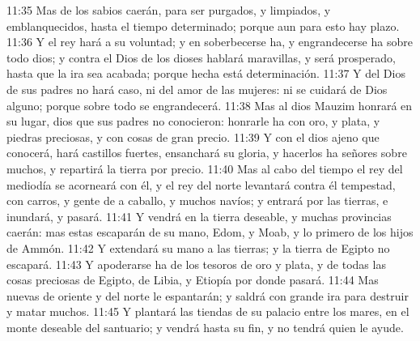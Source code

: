 11:35 Mas de los sabios caerán, para ser purgados, y limpiados, y emblanquecidos, hasta el tiempo determinado; porque aun para esto hay plazo.
11:36 Y el rey hará a su voluntad; y en soberbecerse ha, y engrandecerse ha sobre todo dios; y contra el Dios de los dioses hablará maravillas, y será prosperado, hasta que la ira sea acabada; porque hecha está determinación.
11:37 Y del Dios de sus padres no hará caso, ni del amor de las mujeres: ni se cuidará de Dios alguno; porque sobre todo se engrandecerá.
11:38 Mas al dios Mauzim honrará en su lugar, dios que sus padres no conocieron: honrarle ha con oro, y plata, y piedras preciosas, y con cosas de gran precio.
11:39 Y con el dios ajeno que conocerá, hará castillos fuertes, ensanchará su gloria, y hacerlos ha señores sobre muchos, y repartirá la tierra por precio.
11:40 Mas al cabo del tiempo el rey del mediodía se acorneará con él, y el rey del norte levantará contra él tempestad, con carros, y gente de a caballo, y muchos navíos; y entrará por las tierras, e inundará, y pasará.
11:41 Y vendrá en la tierra deseable, y muchas provincias caerán: mas estas escaparán de su mano, Edom, y Moab, y lo primero de los hijos de Ammón.
11:42 Y extendará su mano a las tierras; y la tierra de Egipto no escapará.
11:43 Y apoderarse ha de los tesoros de oro y plata, y de todas las cosas preciosas de Egipto, de Libia, y Etiopía por donde pasará.
11:44 Mas nuevas de oriente y del norte le espantarán; y saldrá con grande ira para destruir y matar muchos.
11:45 Y plantará las tiendas de su palacio entre los mares, en el monte deseable del santuario; y vendrá hasta su fin, y no tendrá quien le ayude.

